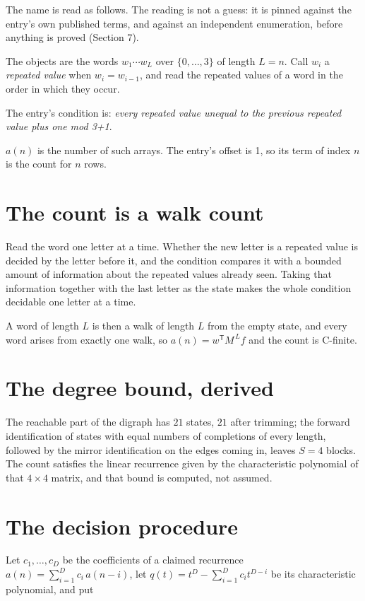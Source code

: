 \documentclass[11pt]{article}
\theoremstyle{definition}
\begin{document}
The name is read as follows. The reading is not a guess: it is pinned against the entry's own published terms, and against an independent enumeration, before anything is proved (Section 7).

The objects are the words $w_1\cdots w_L$ over $\{0,\dots,3\}$ of length $L = n$. Call $w_i$ a {\itshape repeated value} when $w_i = w_{i-1}$, and read the repeated values of a word in the order in which they occur.

The entry's condition is: {\itshape every repeated value unequal to the previous repeated value plus one mod 3+1}.

$a(n)$ is the number of such arrays. The entry's offset is 1, so its term of index $n$ is the count for $n$ rows.

\section{The count is a walk count}

Read the word one letter at a time. Whether the new letter is a repeated value is decided by the letter before it, and the condition compares it with a bounded amount of information about the repeated values already seen. Taking that information together with the last letter as the state makes the whole condition decidable one letter at a time.

A word of length $L$ is then a walk of length $L$ from the empty state, and every word arises from exactly one walk, so $a(n) = w^{\mathsf T}M^{\,L}f$ and the count is C-finite.

\section{The degree bound, derived}

The reachable part of the digraph has $21$ states, $21$ after trimming; the forward identification of states with equal numbers of completions of every length, followed by the mirror identification on the edges coming in, leaves $S = 4$ blocks. The count satisfies the linear recurrence given by the characteristic polynomial of that $4\times4$ matrix, and that bound is computed, not assumed.

\section{The decision procedure}

Let $c_1,\dots,c_D$ be the coefficients of a claimed recurrence $a(n) = \sum_{i=1}^{D} c_i\,a(n-i)$, let $q(t) = t^{D} - \sum_{i=1}^{D} c_i t^{D-i}$ be its characteristic polynomial, and put
\end{document}
